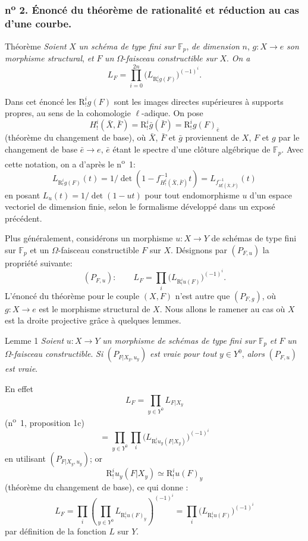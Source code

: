 \subsubsection*{n\textsuperscript{o} 2. Énoncé du théorème de rationalité et réduction au cas d'une courbe.}

\begin{statement}{Théorème}
\emph{Soient} $X$ \emph{un schéma de type fini sur} $\mathbb{F}_p$, \emph{de dimension} $n$, $g:X\to e$ \emph{son morphisme structural}, \emph{et} $F$ \emph{un} $\Omega$-\emph{faisceau constructible sur} $X$. \emph{On a}
\[
L_F=\prod_{i=0}^{2n}\bigl(L_{\mathrm{R}^i_!g(F)}\bigr)^{(-1)^i}.
\tag{1}
\]
\end{statement}

Dans cet énoncé les $\mathrm{R}^i_!g(F)$ sont les images directes supérieures à supports propres, au sens de la cohomologie $\ell$-adique. On pose
\[
H^i_!(\bar X,\bar F)=\mathrm{R}^i_!\bar g(\bar F)=\mathrm{R}^i_!g(F)_{\bar e}
\]
(théorème du changement de base), où 
$\bar X$, $\bar F$ et $\bar g$
proviennent de $X$, $F$ et $g$ par le changement de base $\bar e\to e$, $\bar e$ étant le spectre d'une clôture algébrique de $\mathbb{F}_p$. Avec cette notation, on a d'après le n\textsuperscript{o}~1:
\[
L_{\mathrm{R}^i_!g(F)}(t)=1/\det(1-f^{-1}_{H^i_!(\bar X,\bar F)}t)
 =L_{f^{-1}_{H^i_!(\bar X,\bar F)}}(t)
\]
en posant $L_u(t)=1/\det(1-ut)$ pour tout endomorphisme $u$ d'un espace vectoriel de dimension finie, selon le formalisme développé dans un exposé précédent.

Plus généralement, considérons un morphisme $u:X\to Y$ de schémas de type fini sur $\mathbb{F}_p$ et un $\Omega$-faisceau constructible $F$ sur $X$. Désignons par $(P_{F,u})$ la propriété suivante:
\[
(P_{F,u}):\qquad
L_F=\prod_i\bigl(L_{\mathrm{R}^i_!u(F)}\bigr)^{(-1)^i}.
\]
L'énoncé du théorème pour le couple $(X,F)$ n'est autre que $(P_{F,g})$, où $g:X\to e$ est le morphisme structural de $X$. Nous allons le ramener au cas où $X$ est la droite projective grâce à quelques lemmes.

\begin{statement}{Lemme 1}
\emph{Soient} $u:X\to Y$ \emph{un morphisme de schémas de type fini sur} $\mathbb{F}_p$ \emph{et} $F$ \emph{un} $\Omega$-\emph{faisceau constructible}. \emph{Si} $(P_{F|X_y,u_y})$ \emph{est vraie pour tout} $y\in Y^0$, \emph{alors} $(P_{F,u})$ \emph{est vraie}.
\end{statement}

En effet
\[
L_F=\prod_{y\in Y^0}L_{F|X_y}
\]
(n\textsuperscript{o}~1, proposition 1c)
\[
=\prod_{y\in Y^0}\prod_i\bigl(L_{\mathrm{R}^i_!u_y(F|X_y)}\bigr)^{(-1)^i}
\]
en utilisant $(P_{F|X_y,u_y})$; or
\[
\mathrm{R}^i_!u_y(F|X_y)\simeq \mathrm{R}^i_!u(F)_y
\]
(théorème du changement de base), ce qui 
donne :
\[
L_F=\prod_i\left(\prod_{y\in Y^0}L_{\mathrm{R}^i_!u(F)_y}\right)^{(-1)^i}
=\prod_i\bigl(L_{\mathrm{R}^i_!u(F)}\bigr)^{(-1)^i}
\]
par
définition de la fonction $L$ sur $Y$.

